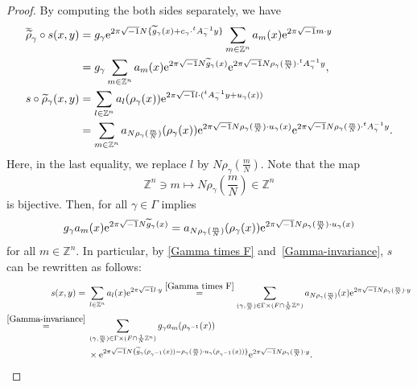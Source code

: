 \documentclass[pdftex]{sigma}
\numberwithin{equation}{section}
\newcommand{\Z}{\mathbb{Z}}
\renewcommand{\tilde}{\widetilde}
\newcommand{\vardbtilde}[1]{\tilde{\raisebox{0pt}[0.85\height]{$\tilde{#1}$}}}
\begin{document}
\begin{proof}
By computing the both sides separately, we have
\begin{align*}%
{\vardbtilde \rho}_\gamma\circ s (x,y)&=g_\gamma {\rm e}^{2\pi\sqrt{-1}N \{{\tilde g}_\gamma (x)+c_\gamma\cdot {}^tA_\gamma^{-1}y \}}\sum_{m\in \Z^n}a_m(x){\rm e}^{2\pi\sqrt{-1}m\cdot y} \\
&=g_\gamma\sum_{m\in \Z^n}a_m(x){\rm e}^{2\pi\sqrt{-1}N{\tilde g}_\gamma (x)}{\rm e}^{2\pi\sqrt{-1}N\rho_{\gamma} (\frac{m}{N} )\cdot {}^tA_\gamma^{-1}y},\\
s\circ {\tilde \rho}_\gamma(x,y)&=\sum_{l\in \Z^n}a_l (\rho_\gamma(x) ){\rm e}^{2\pi\sqrt{-1}l\cdot ({}^tA_\gamma^{-1}y+u_\gamma(x) )} \\
&=\sum_{m\in \Z^n}a_{N\rho_{\gamma} (\frac{m}{N} )} (\rho_\gamma(x) ){\rm e}^{2\pi\sqrt{-1}N\rho_{\gamma} (\frac{m}{N} )\cdot u_\gamma(x)}{\rm e}^{2\pi\sqrt{-1}N\rho_{\gamma} (\frac{m}{N} )\cdot {}^tA_\gamma^{-1}y}.
\end{align*}
Here, in the last equality, we replace $l$ by $N\rho_{\gamma}(\frac{m}{N})$. Note that the map
\[
\Z^n\ni m\mapsto N\rho_{\gamma}\left(\frac{m}{N}\right)\in \Z^n
\]
 is bijective. Then, \smash{${\vardbtilde \rho}_\gamma\circ s=s\circ {\tilde \rho}_\gamma$} for all $\gamma\in \Gamma$ implies
\[
g_\gamma a_m(x){\rm e}^{2\pi\sqrt{-1}N{\tilde g}_\gamma (x)}=a_{N\rho_{\gamma}(\frac{m}{N})}(\rho_\gamma(x)){\rm e}^{2\pi\sqrt{-1}N\rho_{\gamma}(\frac{m}{N})\cdot u_\gamma(x)}
\]
for all $m\in \Z^n$. In particular, by \eqref{Gamma times F} and~\eqref{Gamma-invariance}, $s$ can be rewritten as follows:
\begin{align*}
s(x,y)={}&\sum_{l\in \Z^n}a_l(x){\rm e}^{2\pi\sqrt{-1}l\cdot y} \stackrel{\eqref{Gamma times F}}{=}\sum_{(\gamma ,\frac{m}{N})\in \Gamma \times (F\cap \frac{1}{N}\Z^n)}a_{N\rho_{\gamma}(\frac{m}{N})}(x){\rm e}^{2\pi\sqrt{-1}N\rho_{\gamma}(\frac{m}{N})\cdot y} \\
\stackrel{\eqref{Gamma-invariance}}{=}{}&\sum_{ (\gamma ,\frac{m}{N} )\in \Gamma \times (F\cap \frac{1}{N}\Z^n )}g_{\gamma}a_m (\rho_{\gamma^{-1}}(x) )\\
&\times {\rm e}^{2\pi\sqrt{-1}N \{{\tilde g}_\gamma (\rho_{\gamma^{-1}}(x) )-\rho_{\gamma}(\frac{m}{N})\cdot u_{\gamma} (\rho_{\gamma^{-1}}(x) ) \}}{\rm e}^{2\pi\sqrt{-1}N\rho_{\gamma}(\frac{m}{N})\cdot y}.\tag*{\qed}
\end{align*} \renewcommand{\qed}{}
\end{proof}
\end{document}
